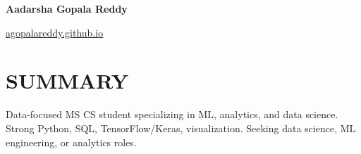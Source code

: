 \documentclass[10pt, letterpaper]{article}
\begin{document}
\begin{header}
  \begin{minipage}[t]{0.65\textwidth}
    \fontsize{20pt}{20pt}\selectfont \textbf{Aadarsha Gopala Reddy}\\
    \normalsize
    \mbox{}%
    \kern {}%
    \AND%
    \kern {}%
    \mbox{}%
  \end{minipage}
  \hfill %
  \begin{minipage}[t]{0.15\textwidth}
    \raggedleft %
    \href{https://agopalareddy.github.io}{agopalareddy.github.io}
  \end{minipage}
  \hfill %
  \begin{minipage}[t]{0.11\textwidth}
    \raggedleft %
  \end{minipage}
\end{header}

\vspace{\headerSpacing} %

\section{SUMMARY}

\vspace{\entrySpacing} %
\begin{samepage} %
  \begin{onecolentry}
    Data-focused MS CS student specializing in ML, analytics, and data science. Strong Python, SQL, TensorFlow/Keras, visualization. Seeking data science, ML engineering, or analytics roles.
  \end{onecolentry}
\end{samepage}
\end{document}
